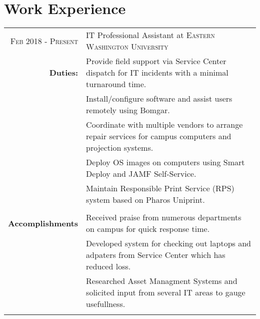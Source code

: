 \documentclass[a4paper,10pt]{article}
\begin{document}
\section{Work Experience}
\begin{tabular}{r|p{14cm}}
\textsc{Feb 2018 - Present} & IT Professional Assistant at \textsc{Eastern Washington University}\\
	\textbf{Duties:}& \footnotesize{\textbullet Provide field support via Service Center dispatch for IT incidents with a minimal turnaround time.}\\
	& \footnotesize{\textbullet Install/configure software and assist users remotely using Bomgar. } \\
	& \footnotesize{\textbullet Coordinate with multiple vendors to arrange repair services for campus computers and projection systems.}\\
	& \footnotesize{\textbullet Deploy OS images on computers using Smart Deploy and JAMF Self-Service.}\\
	& \footnotesize{\textbullet Maintain Responsible Print Service (RPS) system based on Pharos Uniprint.}\\
	\\
	\textbf{Accomplishments} & \footnotesize{\textbullet Received praise from numerous departments on campus for quick response time.}\\
	& \footnotesize{\textbullet Developed system for checking out laptops and adpaters from Service Center which has reduced loss.}\\
	& \footnotesize{\textbullet Researched Asset Managment Systems and solicited input from several IT areas to gauge usefullness.}\\
	\multicolumn{2}{c}{} \\


\end{tabular}
\end{document}
